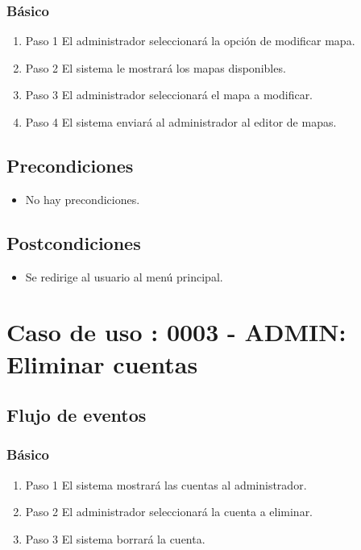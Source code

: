 \subsubsection{Básico}

\begin{enumerate}
\item Paso 1
El administrador seleccionará la opción de modificar mapa.
\item Paso 2
El sistema le mostrará los mapas disponibles.
\item Paso 3
El administrador seleccionará el mapa a modificar.
\item Paso 4
El sistema enviará al administrador al editor de mapas.
\end{enumerate}


\subsection{Precondiciones}
\begin{itemize}
\item No hay precondiciones.
\end{itemize}
\subsection{Postcondiciones}
\begin{itemize}
\item Se redirige al usuario al menú principal.
\end{itemize}

\section{Caso de uso : 0003 - ADMIN: Eliminar cuentas}\label{sec:uc0}



\subsection{Flujo de eventos}

\subsubsection{Básico}

\begin{enumerate}
\item Paso 1
El sistema mostrará las cuentas al administrador.
\item Paso 2
El administrador seleccionará la cuenta a eliminar.
\item Paso 3
El sistema borrará la cuenta.
\end{enumerate}

